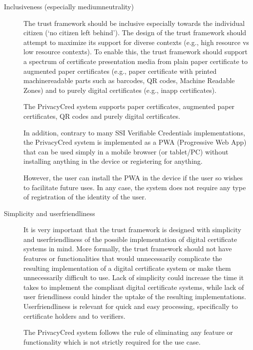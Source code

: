 \documentclass[letterpaper,10pt,english]{sphinxmanual}
\begin{document}
\begin{description}
\item[{Inclusiveness (especially medium\sphinxhyphen{}neutrality)}] \leavevmode
\sphinxAtStartPar
The trust framework should be inclusive especially towards the individual citizen (‘no citizen left behind’). The design of the trust framework should attempt to maximize its support for diverse contexts (e.g., high resource vs low resource contexts). To enable this, the trust framework should support a spectrum of certificate presentation media from plain paper certificate to augmented paper certificates (e.g., paper certificate with printed machinereadable parts such as barcodes, QR codes, Machine Readable Zones) and to purely digital certificates (e.g., in\sphinxhyphen{}app certificates).

\sphinxAtStartPar
The PrivacyCred system supports paper certificates, augmented paper certificates, QR codes and purely digital certificates.

\sphinxAtStartPar
In addition, contrary to many SSI Verifiable Credentials implementations, the PrivacyCred system is implemented as a PWA (Progressive Web App) that can be used simply in a mobile browser (or tablet/PC) without installing anything in the device or registering for anything.

\sphinxAtStartPar
However, the user can install the PWA in the device if the user so wishes to facilitate future uses. In any case, the system does not require any type of registration of the identity of the user.

\item[{Simplicity and user\sphinxhyphen{}friendliness}] \leavevmode
\sphinxAtStartPar
It is very important that the trust framework is designed with simplicity and user\sphinxhyphen{}friendliness of the possible implementation of digital certificate systems in mind. More formally, the trust framework should not have features or functionalities that would unnecessarily complicate the resulting implementation of a digital certificate system or make them unnecessarily difficult to use. Lack of simplicity could increase the time it takes to implement the compliant digital certificate systems, while lack of user friendliness could hinder the uptake of the resulting implementations. User\sphinxhyphen{}friendliness is relevant for quick and easy processing, specifically to certificate holders and to verifiers.

\sphinxAtStartPar
The PrivacyCred system follows the rule of  eliminating any feature or functionality which is not strictly required for the use case.


\end{description}
\end{document}
